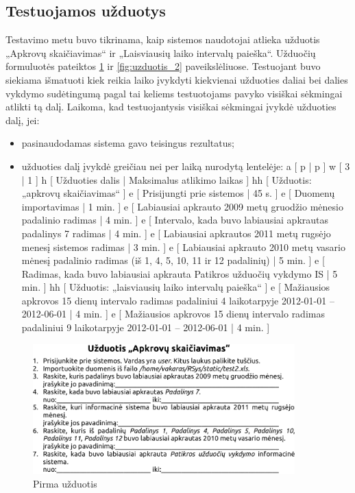\subsection{Testuojamos užduotys}

Testavimo metu buvo tikrinama, kaip sistemos naudotojai atlieka
užduotis „Apkrovų skaičiavimas“ ir „Laisviausių laiko
intervalų paieška“. Užduočių formuluotės pateiktos
\ref{fig:uzduotis_1} ir \ref{fig:uzduotis_2} paveikslėliuose.
Testuojant buvo siekiama išmatuoti kiek reikia laiko įvykdyti
kiekvienai užduoties daliai bei dalies vykdymo sudėtingumą pagal tai
keliems testuotojams pavyko visiškai sėkmingai atlikti tą dalį.
Laikoma, kad testuojantysis visiškai sėkmingai įvykdė užduoties dalį,
jei:
\begin{itemize}
  \item pasinaudodamas sistema gavo teisingus rezultatus;
  \item užduoties dalį įvykdė greičiau nei per laiką nurodytą lentelėje:
\xtableu
{
  a [ p | p ]
  w [ 3 | 1 ]
  h [ Užduoties dalis | Maksimalus atlikimo laikas ]
  hh [ Užduotis: „apkrovų skaičiavimas“ ]
  e [ Prisijungti prie sistemos | 45 s. ]
  e [ Duomenų importavimas | 1 min. ]
  e [ Labiausiai apkrauto 2009 metų gruodžio mėnesio padalinio radimas 
      | 4 min. ]
  e [ Intervalo, kada buvo labiausiai apkrautas padalinys 7 radimas 
      | 4 min. ]
  e [ Labiausiai apkrautos 2011 metų rugsėjo menesį sistemos radimas 
      | 3 min. ]
  e [ Labiausiai apkrauto 2010 metų vasario mėnesį padalinio radimas
      (iš 1, 4, 5, 10, 11 ir 12 padalinių) 
      | 5 min. ]
  e [ Radimas, kada buvo labiausiai apkrauta Patikros užduočių vykdymo IS 
      | 5 min. ]
  hh [ Užduotis: „laisviausių laiko intervalų paieška“ ]
  e [ Mažiausios apkrovos 15 dienų intervalo radimas padaliniui 
      4 laikotarpyje 2012-01-01 – 2012-06-01 | 4 min. ]
  e [ Mažiausios apkrovos 15 dienų intervalo radimas padaliniui 
      9 laikotarpyje 2012-01-01 – 2012-06-01 | 4 min. ]
}
\end{itemize}

\begin{figure}[H]
  \begin{center}
    \includegraphics[width=0.9\textwidth]{./4/pdfs/uzduotis1.pdf}
  \end{center}
  \caption{Pirma užduotis}
  \label{fig:uzduotis_1}
\end{figure}

